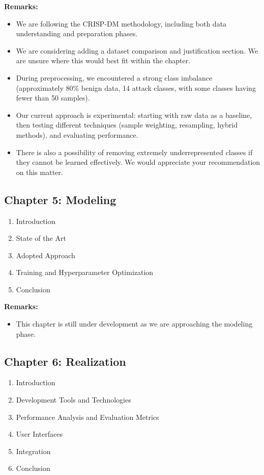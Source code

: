 \documentclass[12pt]{article}
\begin{document}
\textbf{Remarks:}
\begin{itemize}
    \item We are following the CRISP-DM methodology, including both data understanding and preparation phases.
    \item We are considering adding a dataset comparison and justification section. We are unsure where this would best fit within the chapter.
    \item During preprocessing, we encountered a strong class imbalance (approximately 80\% benign data, 14 attack classes, with some classes having fewer than 50 samples).
    \item Our current approach is experimental: starting with raw data as a baseline, then testing different techniques (sample weighting, resampling, hybrid methods), and evaluating performance.
    \item There is also a possibility of removing extremely underrepresented classes if they cannot be learned effectively. We would appreciate your recommendation on this matter.
\end{itemize}

\subsection*{Chapter 5: Modeling}
\begin{enumerate}[label=\arabic*.]
    \item Introduction
    \item State of the Art
    \item Adopted Approach
    \item Training and Hyperparameter Optimization
    \item Conclusion
\end{enumerate}

\textbf{Remarks:}
\begin{itemize}
    \item This chapter is still under development as we are approaching the modeling phase.
\end{itemize}

\subsection*{Chapter 6: Realization}
\begin{enumerate}[label=\arabic*.]
    \item Introduction
    \item Development Tools and Technologies
    \item Performance Analysis and Evaluation Metrics
    \item User Interfaces
    \item Integration
    \item Conclusion
\end{enumerate}
\end{document}
